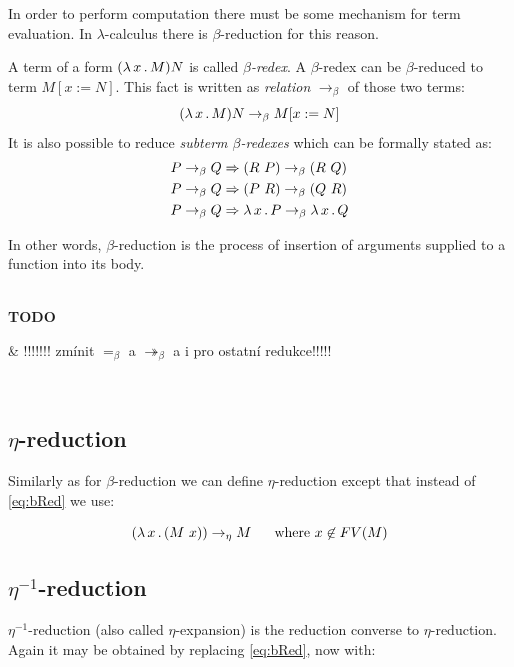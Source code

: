 \documentclass[12pt,a4paper]{report}
\newenvironment{todo}
{ ~\\[0.5em]
  {\color{red}\textbf{TODO}}
  \begin{easylist}[itemize]}
{ \end{easylist}
  ~}
\begin{document}
In order to perform computation there must be some
mechanism for term evaluation. In $\lambda$-calculus there
is $\beta$-reduction for this reason.\\

\newcommand{\bRedex}{$\beta$-redex\xspace}
\newcommand{\bRedexes}{$\beta$-redexes\xspace}
\newcommand{\bArrow}{\rightarrow_\beta\xspace}
\newcommand{\eArrow}{\rightarrow_\eta\xspace}
\newcommand{\eeArrow}{\rightarrow_{\eta^{-1}}\xspace}

A term of a form $( \lambda \, x \, . \, M )N$ is called \textit{\bRedex}.
A \bRedex can be $\beta$-reduced to term $M[x:=N]$. 
This fact is written as \textit{relation} $\bArrow$ 
of those two terms:
\begin{equation} \label{eq:bRed}
\lamb{x}{M}N \bArrow M[x:=N]
\end{equation}
It is also possible to reduce \textit{subterm \bRedexes} 
which can be formally stated as:
\begin{align*}
P \bArrow Q &\then (R~P)      \bArrow (R~Q) \\
P \bArrow Q &\then (P~R)      \bArrow (Q~R) \\
P \bArrow Q &\then \lam{x}{P} \bArrow \lam{x}{Q}  
\end{align*}

In other words, $\beta$-reduction is the process 
of insertion of arguments supplied to a function into 
its body. 

\begin{todo}
& !!!!!!! zmínit $=_\beta$ a $\twoheadrightarrow_\beta$  a i pro ostatní redukce!!!!!
\end{todo}


\subsection{$\eta$-reduction}

Similarly as for $\beta$-reduction we can define $\eta$-reduction 
except that instead of \ref{eq:bRed} we use:  

$$\lamb{x}{(M~x)} \eArrow M \text{ ~~~~where } x \not\in FV(M) $$

\subsection{$\eta^{-1}$-reduction}

$\eta^{-1}$-reduction (also called $\eta$-expansion) is 
the reduction converse to $\eta$-reduction.
Again it may be obtained by replacing \ref{eq:bRed}, now with:  
\end{document}

